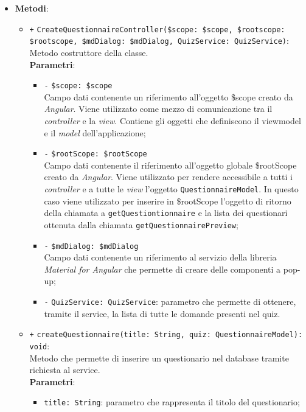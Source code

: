 \begin{itemize}
\begin{itemize}
		
	\end{itemize}
	\item \textbf{Metodi}:
	\begin{itemize}
		\item \texttt{+} \texttt{CreateQuestionnaireController(\$scope: \$scope, \$rootscope: \$rootscope, \$mdDialog: \$mdDialog, QuizService: QuizService)}: \\ Metodo costruttore della classe. \\
		\textbf{Parametri}:
		\begin{itemize}
			\item \texttt{-} \texttt{\$scope: \$scope} \\
			Campo dati contenente un riferimento all'oggetto \$scope creato da \textit{Angular}. Viene utilizzato come mezzo di comunicazione tra il \textit{controller} e la \textit{view}. Contiene gli oggetti che definiscono il viewmodel e il \textit{model} dell'applicazione;
				\item \texttt{-} \texttt{\$rootScope: \$rootScope} \\
				Campo dati contenente il riferimento all'oggetto globale \$rootScope creato da \textit{Angular}. Viene utilizzato per rendere accessibile a tutti i \textit{controller} e a tutte le \textit{view} l'oggetto \texttt{QuestionnaireModel}. In questo caso viene utilizzato per inserire in \$rootScope l'oggetto di ritorno della chiamata a \texttt{getQuestiontionnaire} e la lista dei questionari ottenuta dalla chiamata \texttt{getQuestionnairePreview};
			\item \texttt{-} \texttt{\$mdDialog: \$mdDialog} \\
			Campo dati contenente un riferimento al servizio della libreria \textit{Material for Angular} che permette di creare delle componenti a pop-up;
			\item \texttt{-} \texttt{QuizService: QuizService}: parametro che permette di ottenere, tramite il service, la lista di tutte le domande presenti nel quiz.
		\end{itemize}
		\item \texttt{+} \texttt{createQuestionnaire(title: String, quiz: QuestionnaireModel): void}: \\Metodo che permette di inserire un questionario nel database tramite richiesta al service. \\
			\textbf{Parametri}:
			\begin{itemize}
				\item 
				\texttt{title: String}: parametro che rappresenta il titolo del questionario;

\end{itemize}
\end{itemize}
\end{itemize}
